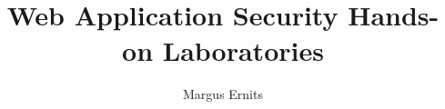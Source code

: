 \documentclass[12pt,a4paper,oneside]{memoir}
\author{Margus Ernits}
\title{Web Application Security Hands-on Laboratories}
\begin{document}
\maketitle
\tableofcontents
\listoffigures
\listoftables
\printglossaries

\end{document}
